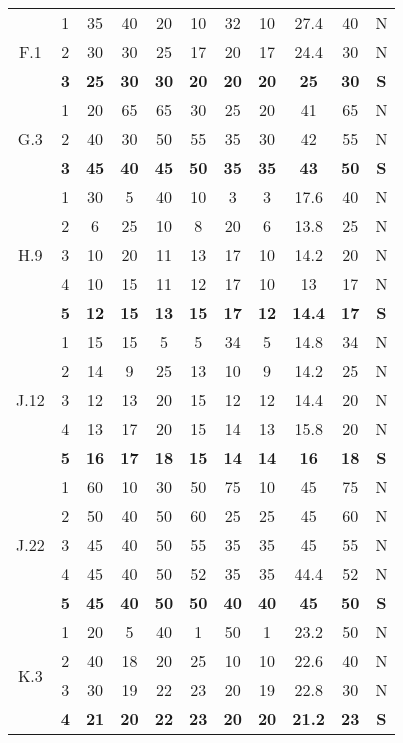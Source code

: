 \documentclass[11pt,a4paper,spanish,twoside]{report}
\begin{document}
\begin{tabular}{|c|c||c|c|c|c|c||c|c|c||c|}
    \hline
    \multirow{3}{c}{F.1} & 1 & 35 & 40 & 20 & 10 & 32 & 10 & 27.4 & 40 & N \\
    & 2 & 30 & 30 & 25 & 17 & 20 & 17 & 24.4 & 30 & N \\
    & \textbf{3} & \textbf{25} & \textbf{30} & \textbf{30} & \textbf{20} &
    \textbf{20} & \textbf{20} & \textbf{25} & \textbf{30} & \textbf{S} \\ 
    \hline
    \multirow{3}{c}{G.3} & 1 & 20 & 65 & 65 & 30 & 25 & 20 & 41 & 65 & N \\
    & 2 & 40 & 30 & 50 & 55 & 35 & 30 & 42 & 55 & N \\
    & \textbf{3} & \textbf{45} & \textbf{40} & \textbf{45} & \textbf{50} &
    \textbf{35} & \textbf{35} & \textbf{43} & \textbf{50} & \textbf{S} \\ 
    \hline
    \multirow{5}{c}{H.9} & 1 & 30 & 5 & 40 & 10 & 3 & 3 & 17.6 & 40 & N \\
    & 2 & 6 & 25 & 10 & 8 & 20 & 6 & 13.8 & 25 & N \\
    & 3 & 10 & 20 & 11 & 13 & 17 & 10 & 14.2 & 20 & N \\
    & 4 & 10 & 15 & 11 & 12 & 17 & 10 & 13 & 17 & N \\
    & \textbf{5} & \textbf{12} & \textbf{15} & \textbf{13} & \textbf{15} &
    \textbf{17} & \textbf{12} & \textbf{14.4} & \textbf{17} & \textbf{S} \\ 
    \hline
    \multirow{5}{c}{J.12} & 1 & 15 & 15 & 5 & 5 & 34 & 5 & 14.8 & 34 & N \\
    & 2 & 14 & 9 & 25 & 13 & 10 & 9 & 14.2 & 25 & N \\
    & 3 & 12 & 13 & 20 & 15 & 12 & 12 & 14.4 & 20 & N \\
    & 4 & 13 & 17 & 20 & 15 & 14 & 13 & 15.8 & 20 & N \\
    & \textbf{5} & \textbf{16} & \textbf{17} & \textbf{18} & \textbf{15} &
    \textbf{14} & \textbf{14} & \textbf{16} & \textbf{18} & \textbf{S} \\ 
    \hline
    \multirow{5}{c}{J.22} & 1 & 60 & 10 & 30 & 50 & 75 & 10 & 45 & 75 & N \\
    & 2 & 50 & 40 & 50 & 60 & 25 & 25 & 45 & 60 & N \\
    & 3 & 45 & 40 & 50 & 55 & 35 & 35 & 45 & 55 & N \\
    & 4 & 45 & 40 & 50 & 52 & 35 & 35 & 44.4 & 52 & N \\
    & \textbf{5} & \textbf{45} & \textbf{40} & \textbf{50} & \textbf{50} &
    \textbf{40} & \textbf{40} & \textbf{45} & \textbf{50} & \textbf{S} \\ 
    \hline
    \multirow{4}{c}{K.3} & 1 & 20 & 5 & 40 & 1 & 50 & 1 & 23.2 & 50 & N \\
    & 2 & 40 & 18 & 20 & 25 & 10 & 10 & 22.6 & 40 & N \\
    & 3 & 30 & 19 & 22 & 23 & 20 & 19 & 22.8 & 30 & N \\
    & \textbf{4} & \textbf{21} & \textbf{20} & \textbf{22} & \textbf{23} &
    \textbf{20} & \textbf{20} & \textbf{21.2} & \textbf{23} & \textbf{S} \\ 

   \end{tabular}
\end{document}
